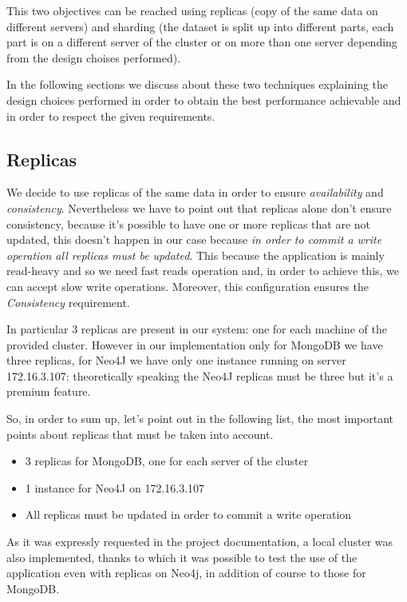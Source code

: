 \documentclass[a4paper]{report}
\begin{document}
\noindent This two objectives can be reached using replicas (copy of the same data on different servers) and sharding (the dataset is split up into different parts, each part is on a different server of the cluster or on more than one server depending from the design choises performed).

\noindent In the following sections we discuss about these two techniques explaining the design choices performed in order to obtain the best performance achievable and in order to respect the given requirements. 



\subsection{Replicas}
We decide to use replicas of the same data in order to ensure \emph{availability} and \emph{consistency}. Nevertheless we have to point out that replicas alone don't ensure consistency, because it's possible to have one or more replicas that are not updated, this doesn't happen in our case because \emph{in order to commit a write operation all replicas must be updated}. This because the application is mainly read-heavy and so we need fast reads operation and, in order to achieve this, we can accept slow write operations. Moreover, this configuration ensures the \emph{Consistency} requirement.

\noindent \noindent In particular 3 replicas are present in our system: one for each machine of the provided cluster. However in our implementation only for MongoDB we have three replicas, for Neo4J we have only one instance running on server 172.16.3.107: theoretically speaking the Neo4J replicas must be three but it's a premium feature.

\noindent So, in order to sum up, let's point out in the following list, the most important points about replicas that must be taken into account.
\begin{itemize}
	\item 3 replicas for MongoDB, one for each server of the cluster
	\item 1 instance for Neo4J on 172.16.3.107
	\item All replicas must be updated in order to commit a write operation
\end{itemize}

\noindent As it was expressly requested in the project documentation, a local cluster was also implemented, thanks to which it was possible to test the use of the application even with replicas on Neo4j, in addition of course to those for MongoDB.
\end{document}
